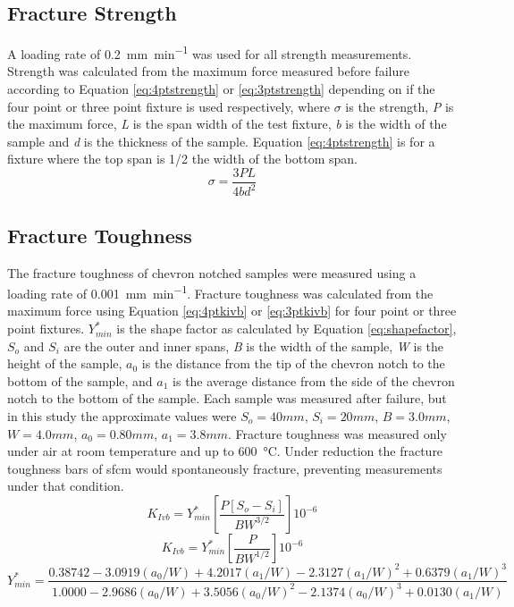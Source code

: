     \subsection{Fracture Strength}
        A loading rate of \SI{0.2}{mm\per\minute} was used for all strength measurements.
        Strength was calculated from the maximum force measured before failure according to Equation \ref{eq:4ptstrength} or \ref{eq:3ptstrength} depending on if the four point or three point fixture is used respectively, where $\sigma{}$ is the strength, \textit{P} is the maximum force, \textit{L} is the span width of the test fixture, \textit{b} is the width of the sample and \textit{d} is the thickness of the sample. Equation \ref{eq:4ptstrength} is for a fixture where the top span is 1/2 the width of the bottom span.\cite{ASTM2008}
        \begin{equation}
            \sigma = \frac{3PL}{4bd^{2}}
            \label{eq:4ptstrength}
        \end{equation}

    \subsection{Fracture Toughness}
        The fracture toughness of chevron notched samples were measured using a loading rate of \SI{0.001}{mm\per\minute}.
        Fracture toughness was calculated from the maximum force using Equation \ref{eq:4ptkivb} or \ref{eq:3ptkivb} for four point or three point fixtures.\cite{ASTM2016a,Wu1984}
        $Y^{*}_{min}$ is the shape factor as calculated by Equation \ref{eq:shapefactor}, $S_o$ and $S_i$ are the outer and inner spans, \textit{B} is the width of the sample, \textit{W} is the height of the sample, $a_0$ is the distance from the tip of the chevron notch to the bottom of the sample, and $a_1$ is the average distance from the side of the chevron notch to the bottom of the sample.
        Each sample was measured after failure, but in this study the approximate values were $S_o = 40 mm$, $S_i = 20 mm$, $B = 3.0 mm$, $W = 4.0 mm$, $a_0 = 0.80 mm$, $a_1 = 3.8 mm$.
        Fracture toughness was measured only under air at room temperature and up to \SI{600}{\celsius}.
        Under reduction the fracture toughness bars of \gls{sfcm} would spontaneously fracture, preventing measurements under that condition.
        \begin{equation}
            K_{Ivb} = Y^{*}_{min}  \left [\frac{P[S_o-S_i]}{BW^{3/2}}\right ]10^{-6}
            \label{eq:4ptkivb}
        \end{equation}
        \begin{equation}
            K_{Ivb} = Y^{*}_{min}  \left [\frac{P}{BW^{1/2}}\right ]10^{-6}
            \label{eq:3ptkivb}
        \end{equation}
        \begin{equation}
            Y^{*}_{min} = \frac{0.38742-3.0919(a_0/W)+4.2017(a_1/W)-2.3127(a_1/W)^2+0.6379(a_1/W)^3}{1.0000-2.9686(a_0/W)+3.5056(a_0/W)^2-2.1374(a_0/W)^3+0.0130(a_1/W)}
            \label{eq:shapefactor}
        \end{equation}

